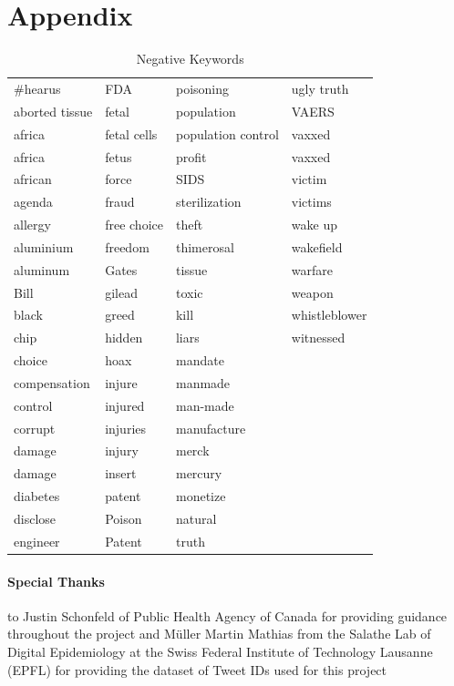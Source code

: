 \documentclass[12pt]{article}
\begin{document}
\section{Appendix}

\begin{table}[h]
\centering
\begin{tabularx}{\linewidth}{ X X X X }
\toprule
\#hearus&FDA&poisoning&ugly truth\\
aborted tissue&fetal&population&VAERS\\
africa&fetal cells&population control&vaxxed\\
africa&fetus&profit&vaxxed\\
african&force&SIDS&victim\\
agenda&fraud&sterilization&victims\\
allergy&free choice&theft&wake up\\
aluminium&freedom&thimerosal&wakefield\\
aluminum&Gates&tissue&warfare\\
Bill&gilead&toxic&weapon\\
black&greed&kill&whistleblower\\
chip&hidden&liars&witnessed\\
choice&hoax&mandate&\\
compensation&injure&manmade&\\
control&injured&man-made&\\
corrupt&injuries&manufacture&\\
damage&injury&merck&\\
damage&insert&mercury&\\
diabetes&patent&monetize&\\
disclose&Poison&natural&\\
engineer&Patent&truth&\\


\bottomrule
\end{tabularx}
\caption{Negative Keywords}
\label{tbl:negkeywords}
\end{table}

\paragraph{Special Thanks}

to Justin Schonfeld of Public Health Agency of Canada for providing guidance throughout the project and Müller Martin Mathias from the Salathe Lab of Digital Epidemiology at the Swiss Federal Institute of Technology Lausanne (EPFL) for providing the dataset of Tweet IDs used for this project

\newpage
%


\end{document}
